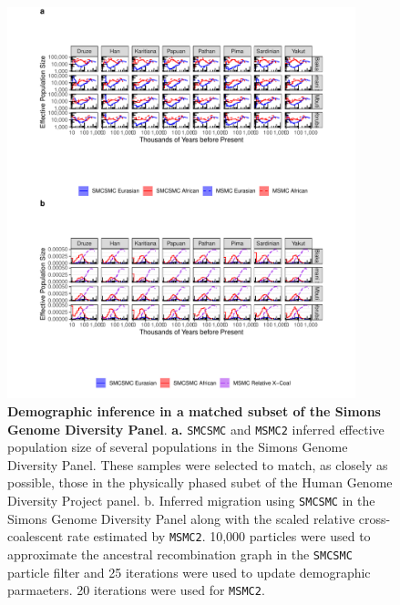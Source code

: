 \documentclass{article}
\begin{document}
\begin{figure}
    \centering
    \includegraphics[width=0.9\textwidth]{plot/subset_ne_mig.pdf}
    \caption{ {\bf Demographic inference in a matched subset of the Simons Genome Diversity Panel}. {\bf a.} {\tt SMCSMC} and {\tt MSMC2} inferred effective population size of several populations in the Simons Genome Diversity Panel. These samples were selected to match, as closely as possible, those in the physically phased subet of the Human Genome Diversity Project panel. {b.} Inferred migration using {\tt SMCSMC} in the Simons Genome Diversity Panel along with the scaled relative cross-coalescent rate estimated by {\tt MSMC2}.  10,000 particles were used to approximate the ancestral recombination graph in the {\tt SMCSMC} particle filter and 25 iterations were used to update demographic parmaeters. 20 iterations were used for {\tt MSMC2}.}
    \label{fig:hgdp_sgdp}
\end{figure}
\end{document}
